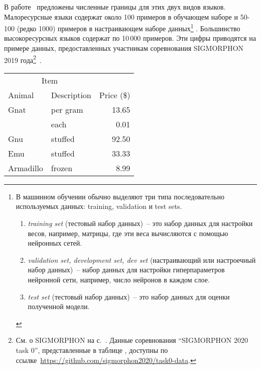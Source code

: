 В работе~\cite{Anastasopoulos2019Pushing_Limits_Low-Resource_MI}
предложены численные границы для этих двух видов языков.
Малоресурсные языки содержат около 100 примеров в обучающем наборе
и 50-100 (редко 1000) примеров в настраивающем наборе данных\footnote{%
    В машинном обучении обычно выделяют три типа
    последовательно используемых данных: training, validation и test sets.
    \begin{enumerate}[label=(\roman*)]
        \item \emph{training set} (тестовый набор данных)~--
            это набор данных для настройки весов, например, матрицы,
            где эти веса вычисляются с помощью нейронных сетей.

        \item \emph{validation set, development set, dev set}
            (настраивающий или настроечный набор данных)~--
            набор данных для настройки гиперпараметров нейронной сети,
            например, число нейронов в каждом слое.

        \item \emph{test set} (тестовый набор данных)~-- это набор данных
            для оценки полученной модели.
    \end{enumerate}
    }%
%
.
Большинство высокоресурсных языков содержат по 10\,000 примеров.
Эти цифры приводятся на примере данных,
предоставленных участникам соревнования SIGMORPHON 2019 года\footnote{%
    См. о SIGMORPHON на с.~\pageref{SIGMORPHON}.
    Данные соревнования ``SIGMORPHON 2020 task 0'', представленные
    в таблице ,
    доступны по
    ссылке~\url{https://github.com/sigmorphon2020/task0-data}.
}~\cite{Anastasopoulos2019Pushing_Limits_Low-Resource_MI}.


\newpage\clearpage


\begin{tabular}{llr}
\hline
\multicolumn{2}{c}{Item} \\
\cline{1-2}
Animal    & Description & Price (\$) \\
\hline
Gnat      & per gram    & 13.65      \\
          & each        & 0.01       \\
Gnu       & stuffed     & 92.50      \\
Emu       & stuffed     & 33.33      \\
Armadillo & frozen      & 8.99       \\
\hline
\end{tabular}






